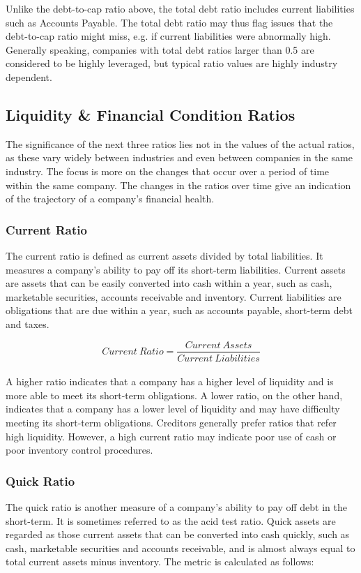 \documentclass{article}
\begin{document}
Unlike the debt-to-cap ratio above, the total debt ratio includes current liabilities such as Accounts Payable. The total debt ratio may thus flag issues that the debt-to-cap ratio might miss, e.g. if current liabilities were abnormally high. Generally speaking, companies with total debt ratios larger than 0.5 are considered to be highly leveraged, but typical ratio values are highly industry dependent. 

\subsection{Liquidity \& Financial Condition Ratios}
The significance of the next three ratios lies not in the values of the actual ratios, as these vary widely between industries and even between companies in the same industry. The focus is more on the changes that occur over a period of time within the same company. The changes in the ratios over time give an indication of the trajectory of a company's financial health. 

\subsubsection{Current Ratio}
The current ratio is defined as current assets divided by total liabilities. It measures a company's ability to pay off its short-term liabilities. Current assets are assets that can be easily converted into cash within a year, such as cash, marketable securities, accounts receivable and inventory. Current liabilities are obligations that are due within a year, such as accounts payable, short-term debt and taxes.

 \begin{equation}
    Current\: Ratio = \frac{Current\: Assets}{Current\: Liabilities}
\end{equation}\\

A higher ratio indicates that a company has a higher level of liquidity and is more able to meet its short-term obligations. A lower ratio, on the other hand, indicates that a company has a lower level of liquidity and may have difficulty meeting its short-term obligations. Creditors generally prefer ratios that refer high liquidity. However, a high current ratio may indicate poor use of cash or poor inventory control procedures. 

\subsubsection{Quick Ratio}
The quick ratio is another measure of a company's ability to pay off debt in the short-term. It is sometimes referred to as the acid test ratio. Quick assets are regarded as those current assets that can be converted into cash quickly, such as cash, marketable securities and accounts receivable, and is almost always equal to total current assets minus inventory. The metric is calculated as follows:
\end{document}
